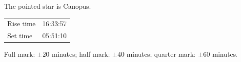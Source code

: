 The pointed star is Canopus.

\begin{center}
\begin{tabular}{ll}
Rise time & 16:33:57 \\
Set time & 05:51:10 \\
\end{tabular}
\end{center}

Full mark: $\pm 20$ minutes; half mark: $\pm 40$ minutes; quarter mark:
$\pm 60$ minutes.
